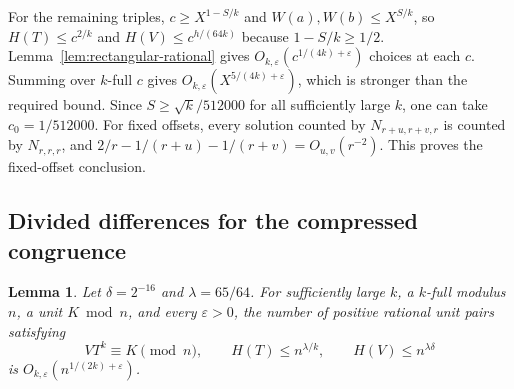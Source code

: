 \documentclass[11pt,reqno]{amsart}
\newtheorem{lemma}[theorem]{Lemma}
\newcommand{\eps}{\varepsilon}
\begin{document}
For the remaining triples, \(c\ge X^{1-S/k}\) and
\(W(a),W(b)\le X^{S/k}\), so
\(H(T)\le c^{2/k}\) and \(H(V)\le c^{h/(64k)}\)
because \(1-S/k\ge1/2\). Lemma~\ref{lem:rectangular-rational}
gives \(O_{k,\eps}(c^{1/(4k)+\eps})\) choices at each \(c\).
Summing over \(k\)-full \(c\) gives \(O_{k,\eps}(X^{5/(4k)+\eps})\),
which is stronger than the required bound.
Since \(S\ge\sqrt{k}/512000\) for all sufficiently large \(k\),
one can take \(c_0=1/512000\).
For fixed offsets, every solution counted by \(N_{r+u,r+v,r}\)
is counted by \(N_{r,r,r}\), and
\(2/r-1/(r+u)-1/(r+v)=O_{u,v}(r^{-2})\).
This proves the fixed-offset conclusion.

\subsection{Divided differences for the compressed congruence}
\label{sec:divided-difference-triples}

\begin{lemma}\label{lem:divided-difference-rational}
Let \(\delta=2^{-16}\) and \(\lambda=65/64\).
For sufficiently large \(k\), a \(k\)-full modulus \(n\),
a unit \(K\bmod n\), and every \(\eps>0\), the number of
positive rational unit pairs satisfying
\[
 VT^k\equiv K\pmod n,\qquad
 H(T)\le n^{\lambda/k},\qquad H(V)\le n^{\lambda\delta}
\]
is \(O_{k,\eps}(n^{1/(2k)+\eps})\).
\end{lemma}
\end{document}
